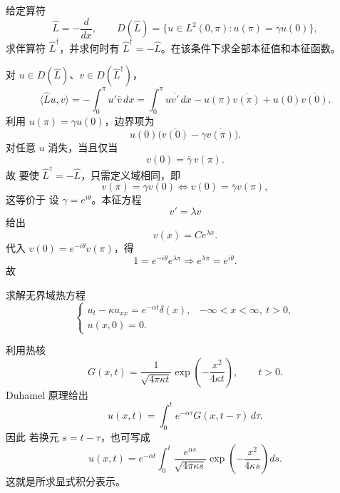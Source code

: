 \begin{question}
给定算符
\[
\hat L=-\frac{d}{dx},
\qquad D(\hat L)=\{u\in L^2(0,\pi):u(\pi)=\gamma u(0)\},
\]
求伴算符 $\hat L^\dagger$，并求何时有 $\hat L^\dagger=-\hat L$。在该条件下求全部本征值和本征函数。
\begin{solution}

对 $u\in D(\hat L)$、$v\in D(\hat L^\dagger)$，
\[
\langle \hat Lu,v\rangle=-\int_0^{\pi}u'\bar v\,dx=
\int_0^{\pi}u\overline{v'}\,dx-u(\pi)\overline{v(\pi)}+u(0)\overline{v(0)}.
\]
利用 $u(\pi)=\gamma u(0)$，边界项为
\[
u(0)\bigl(\overline{v(0)}-\gamma\overline{v(\pi)}\bigr).
\]
对任意 $u$ 消失，当且仅当
\[
 v(0)=\overline\gamma\,v(\pi).
\]
故
要使 $\hat L^\dagger=-\hat L$，只需定义域相同，即
\[
 v(\pi)=\gamma v(0)\iff v(0)=\overline\gamma v(\pi),
\]
这等价于
设 $\gamma=e^{i\theta}$。本征方程
\[
 v'=\lambda v
\]
给出
\[
 v(x)=Ce^{\lambda x}.
\]
代入 $v(0)=e^{-i\theta}v(\pi)$，得
\[
1=e^{-i\theta}e^{\lambda\pi}\Longrightarrow e^{\lambda\pi}=e^{i\theta}.
\]
故
\end{solution}
\end{question}

\begin{question}
求解无界域热方程
\[
\begin{cases}
 u_t-\kappa u_{xx}=e^{-\alpha t}\delta(x), & -\infty<x<\infty,\ t>0,\\
 u(x,0)=0.
\end{cases}
\]

\begin{solution}

利用热核
\[
G(x,t)=\frac{1}{\sqrt{4\pi\kappa t}}\exp\!\left(-\frac{x^2}{4\kappa t}\right),\qquad t>0.
\]
Duhamel 原理给出
\[
 u(x,t)=\int_0^t e^{-\alpha\tau}G(x,t-\tau)\,d\tau.
\]
因此
若换元 $s=t-\tau$，也可写成
\[
 u(x,t)=e^{-\alpha t}\int_0^t \frac{e^{\alpha s}}{\sqrt{4\pi\kappa s}}
\exp\!\left(-\frac{x^2}{4\kappa s}\right)ds.
\]
这就是所求显式积分表示。
\end{solution}
\end{question}

